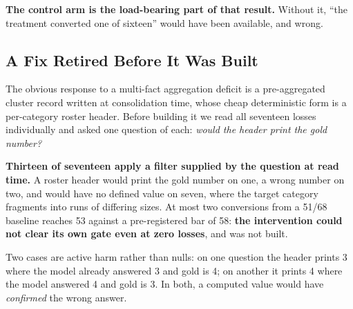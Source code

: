 \textbf{The control arm is the load-bearing part of that result.} Without it, ``the treatment converted one of sixteen'' would have been available, and wrong.

\subsection{A Fix Retired Before It Was Built}
\label{sec:killed}

The obvious response to a multi-fact aggregation deficit is a pre-aggregated cluster record written at consolidation time, whose cheap deterministic form is a per-category roster header. Before building it we read all seventeen losses individually and asked one question of each: \emph{would the header print the gold number?}

\begin{table}[!htbp]
\centering
\caption{What the 3+ stratum losses actually ask.}
\label{tab:shapes}
\end{table}

\textbf{Thirteen of seventeen apply a filter supplied by the question at read time.} A roster header would print the gold number on one, a wrong number on two, and would have no defined value on seven, where the target category fragments into runs of differing sizes. At most two conversions from a 51/68 baseline reaches 53 against a pre-registered bar of 58: \textbf{the intervention could not clear its own gate even at zero losses}, and was not built.

Two cases are active harm rather than nulls: on one question the header prints 3 where the model already answered 3 and gold is 4; on another it prints 4 where the model answered 4 and gold is 3. In both, a computed value would have \emph{confirmed} the wrong answer.

